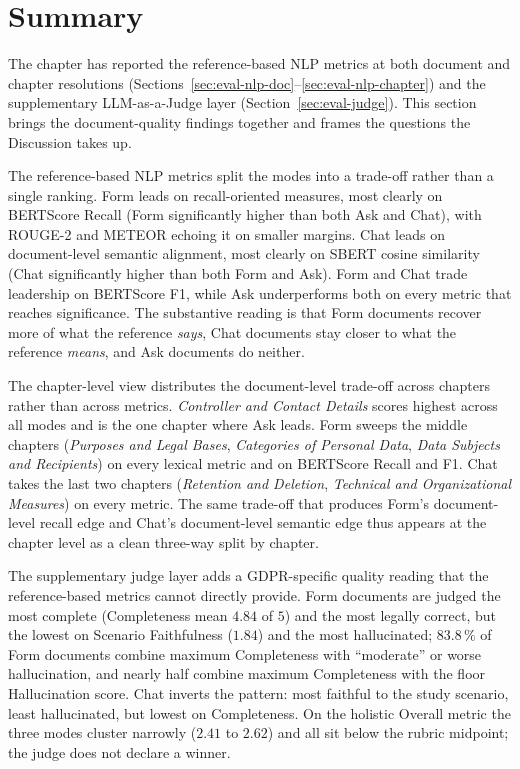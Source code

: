 \section{Summary}
\label{sec:eval-summary}

The chapter has reported the reference-based NLP metrics at both
document and chapter resolutions
(Sections~\ref{sec:eval-nlp-doc}--\ref{sec:eval-nlp-chapter}) and
the supplementary LLM-as-a-Judge layer (Section~\ref{sec:eval-judge}).
This section brings the document-quality findings together and
frames the questions the Discussion takes up.

The reference-based NLP metrics split the modes into a trade-off
rather than a single ranking. Form leads on recall-oriented
measures, most clearly on BERTScore Recall (Form significantly
higher than both Ask and Chat), with ROUGE-2 and METEOR echoing
it on smaller margins. Chat leads on document-level semantic
alignment, most clearly on SBERT cosine similarity (Chat
significantly higher than both Form and Ask). Form and Chat
trade leadership on BERTScore F1, while Ask underperforms both on
every metric that reaches significance.
The substantive reading is that Form documents recover more of
what the reference \emph{says}, Chat documents stay closer to
what the reference \emph{means}, and Ask documents do neither.

\sloppy
The chapter-level view distributes the document-level trade-off
across chapters rather than across metrics. \emph{Controller and
Contact Details} scores highest across all modes and is the one
chapter where Ask leads. Form sweeps the middle chapters
(\emph{Purposes and Legal Bases}, \emph{Categories of Personal
Data}, \emph{Data Subjects and Recipients}) on every lexical
metric and on BERTScore Recall and F1. Chat takes the last two
chapters (\emph{Retention and Deletion}, \emph{Technical and
Organizational Measures}) on every metric. The same trade-off
that produces Form's document-level recall edge and Chat's
document-level semantic edge thus appears at the chapter level
as a clean three-way split by chapter.

The supplementary judge layer adds a GDPR-specific
quality reading that the reference\hspace{0pt}-based
metrics cannot directly provide. Form documents are judged the most
complete (Completeness mean $4.84$ of $5$) and the most legally
correct, but the lowest on Scenario Faithfulness ($1.84$) and the
most hallucinated; $83.8\,\%$ of Form documents combine maximum
Completeness with ``moderate'' or worse hallucination, and nearly
half combine maximum Completeness with the floor Hallucination
score. Chat inverts the pattern: most faithful to the study
scenario, least hallucinated, but lowest on Completeness. On the
holistic Overall metric the three modes cluster narrowly ($2.41$
to $2.62$) and all sit below the rubric midpoint; the judge does
not declare a winner.
\fussy

